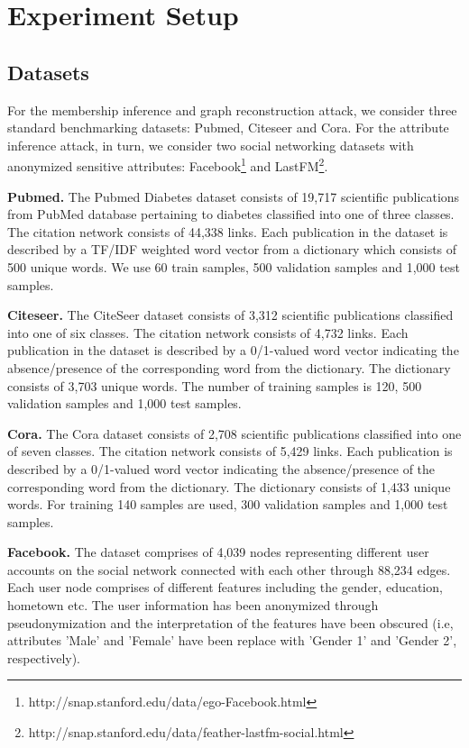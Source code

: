 \section{Experiment Setup}\label{setup}


\subsection{Datasets}

For the membership inference and graph reconstruction attack, we consider three standard benchmarking datasets: Pubmed, Citeseer and Cora.
For the attribute inference attack, in turn, we consider two social networking datasets with anonymized sensitive attributes: Facebook\footnote{http://snap.stanford.edu/data/ego-Facebook.html} and LastFM\footnote{http://snap.stanford.edu/data/feather-lastfm-social.html}.

\noindent\textbf{Pubmed.} The Pubmed Diabetes dataset consists of 19,717 scientific publications from PubMed database pertaining to diabetes classified into one of three classes. The citation network consists of 44,338 links. Each publication in the dataset is described by a TF/IDF weighted word vector from a dictionary which consists of 500 unique words.
We use 60 train samples, 500 validation samples and 1,000 test samples.

\noindent\textbf{Citeseer.} The CiteSeer dataset consists of 3,312 scientific publications classified into one of six classes.
The citation network consists of 4,732 links. Each publication in the dataset is described by a 0/1-valued word vector indicating the absence/presence of the corresponding word from the dictionary.
The dictionary consists of 3,703 unique words.
The number of training samples is 120, 500 validation samples and 1,000 test samples.

\noindent\textbf{Cora.} The Cora dataset consists of 2,708 scientific publications classified into one of seven classes.
The citation network consists of 5,429 links. Each publication is described by a 0/1-valued word vector indicating the absence/presence of the corresponding word from the dictionary.
The dictionary consists of 1,433 unique words.
For training 140 samples are used, 300 validation samples and 1,000 test samples.

\noindent\textbf{Facebook.} The dataset comprises of 4,039 nodes representing different user accounts on the social network connected with each other through 88,234 edges.
Each user node comprises of different features including the gender, education, hometown etc.
The user information has been anonymized through pseudonymization and the interpretation of the features have been obscured (i.e, attributes 'Male' and 'Female' have been replace with 'Gender 1' and 'Gender 2', respectively).


